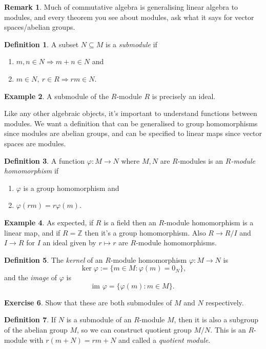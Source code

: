 \documentclass[a4paper]{article}
\newcommand{\im}{\text{im }}
\theoremstyle{definition}
\newtheorem{defn}{Definition}[subsection]
\newtheorem{example}[defn]{Example}
\newtheorem{exe}[defn]{Exercise}
\newtheorem*{remark}{Remark}
\begin{document}
\begin{remark}
Much of commutative algebra is generalising linear algebra to modules, and every theorem you see about modules, ask what it says for vector spaces/abelian groups. 
\end{remark}

\begin{defn}
A subset $N\subseteq M$ is a \textit{submodule} if
\begin{enumerate}
\item $m,n\in N\Rightarrow m+n\in N$ and
\item $m\in N,\ r\in R\Rightarrow rm\in N$.
\end{enumerate}
\end{defn}
\begin{example}
A submodule of the $R$-module $R$ is precisely an ideal.
\end{example}
Like any other algebraic objects, it's important to understand functions between modules. We want a definition that can be generalised to group homomorphisms since modules are abelian groups, and can be specified to linear maps since vector spaces are modules.
\begin{defn}
A function $\varphi:M\rightarrow N$ where $M,N$ are $R$-modules is an $R$\textit{-module homomorphism} if
\begin{enumerate}
\item $\varphi$ is a group homomorphism and
\item $\varphi(rm)=r\varphi(m)$.
\end{enumerate}
\end{defn}
\begin{example}
As expected, if $R$ is a field then an $R$-module homomorphism is a linear map, and if $R=\mathbb Z$ then it's a group homomorphism. Also $R\rightarrow R/I$ and $I\rightarrow R$ for $I$ an ideal given by $r\mapsto r$ are $R$-module homomorphisms.
\end{example}
\begin{defn}
The \textit{kernel} of an $R$-module homomorphism $\varphi:M\rightarrow N$ is
\[
\ker\varphi :=\{m\in M:\varphi(m)=0_N\},
\]
and the \textit{image} of $\varphi$ is
\[
\im \varphi=\{\varphi(m):m\in M\}.
\]
\end{defn}
\begin{exe}
Show that these are both submodules of $M$ and $N$ respectively.
\end{exe}

\begin{defn}
If $N$ is a submodule of an $R$-module $M$, then it is also a subgroup of the abelian group $M$, so we can construct quotient group $M/N$. This is an $R$-module with $r(m+N)=rm+N$ and called a \textit{quotient module}.
\end{defn}
\end{document}
